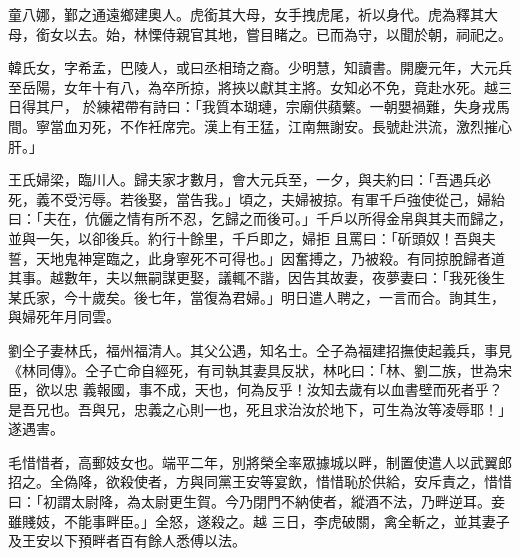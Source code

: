 \begin{pinyinscope}
 童八娜，鄞之通遠鄉建奧人。虎銜其大母，女手拽虎尾，祈以身代。虎為釋其大母，銜女以去。始，林慄侍親官其地，嘗目睹之。已而為守，以聞於朝，祠祀之。



 韓氏女，字希孟，巴陵人，或曰丞相琦之裔。少明慧，知讀書。開慶元年，大元兵至岳陽，女年十有八，為卒所掠，將挾以獻其主將。女知必不免，竟赴水死。越三日得其尸，
 於練裙帶有詩曰：「我質本瑚璉，宗廟供蘋蘩。一朝嬰禍難，失身戎馬間。寧當血刃死，不作衽席完。漢上有王猛，江南無謝安。長號赴洪流，激烈摧心肝。」



 王氏婦梁，臨川人。歸夫家才數月，會大元兵至，一夕，與夫約曰：「吾遇兵必死，義不受污辱。若後娶，當告我。」頃之，夫婦被掠。有軍千戶強使從己，婦紿曰：「夫在，伉儷之情有所不忍，乞歸之而後可。」千戶以所得金帛與其夫而歸之，並與一矢，以卻後兵。約行十餘里，千戶即之，婦拒
 且罵曰：「斫頭奴！吾與夫誓，天地鬼神寔臨之，此身寧死不可得也。」因奮搏之，乃被殺。有同掠脫歸者道其事。越數年，夫以無嗣謀更娶，議輒不諧，因告其故妻，夜夢妻曰：「我死後生某氏家，今十歲矣。後七年，當復為君婦。」明日遣人聘之，一言而合。詢其生，與婦死年月同雲。



 劉仝子妻林氏，福州福清人。其父公遇，知名士。仝子為福建招撫使起義兵，事見《林同傳》。仝子亡命自經死，有司執其妻具反狀，林叱曰：「林、劉二族，世為宋臣，欲以忠
 義報國，事不成，天也，何為反乎！汝知去歲有以血書壁而死者乎？是吾兄也。吾與兄，忠義之心則一也，死且求治汝於地下，可生為汝等凌辱耶！」遂遇害。



 毛惜惜者，高郵妓女也。端平二年，別將榮全率眾據城以畔，制置使遣人以武翼郎招之。全偽降，欲殺使者，方與同黨王安等宴飲，惜惜恥於供給，安斥責之，惜惜曰：「初謂太尉降，為太尉更生賀。今乃閉門不納使者，縱酒不法，乃畔逆耳。妾雖賤妓，不能事畔臣。」全怒，遂殺之。越
 三日，李虎破關，禽全斬之，並其妻子及王安以下預畔者百有餘人悉傅以法。



\end{pinyinscope}